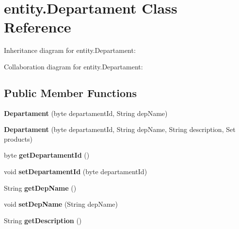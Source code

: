 \hypertarget{classentity_1_1_departament}{}\section{entity.\+Departament Class Reference}
\label{classentity_1_1_departament}


Inheritance diagram for entity.\+Departament\+:


Collaboration diagram for entity.\+Departament\+:
\subsection*{Public Member Functions}
\begin{DoxyCompactItemize}
\item 
\mbox{\label{classentity_1_1_departament_aabee9c9d6e8ebac494a04b155b1dc88b}} 
{\bfseries Departament} (byte departament\+Id, String dep\+Name)
\item 
\mbox{\label{classentity_1_1_departament_a54014ddb3c17c6a16b30c6b3ca8bc5f7}} 
{\bfseries Departament} (byte departament\+Id, String dep\+Name, String description, Set products)
\item 
\mbox{\label{classentity_1_1_departament_ab1c66ffc4862ab88d0f49a85f5358b4c}} 
byte {\bfseries get\+Departament\+Id} ()
\item 
\mbox{\label{classentity_1_1_departament_a35cf439bb17df38af5f4d7dbcfb6413b}} 
void {\bfseries set\+Departament\+Id} (byte departament\+Id)
\item 
\mbox{\label{classentity_1_1_departament_a28c9949df7e14641133dcca20f5562dc}} 
String {\bfseries get\+Dep\+Name} ()
\item 
\mbox{\label{classentity_1_1_departament_aea77ef1f0c423cdde3317cc47a2f37b7}} 
void {\bfseries set\+Dep\+Name} (String dep\+Name)
\item 
\mbox{\label{classentity_1_1_departament_a5332bf92f5b29d56e9559037f3c6f4a2}} 
String {\bfseries get\+Description} ()
\item 

\end{DoxyCompactItemize}
